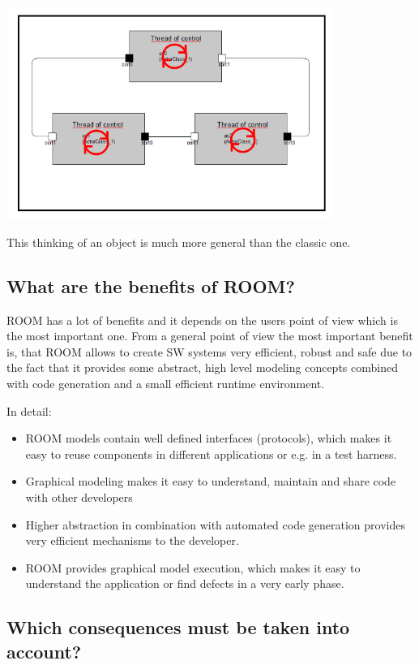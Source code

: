 \includegraphics[width=0.8\textwidth]{images/010-RoomIntroduction03.png}

This thinking of an object is much more general than the classic one.  

\subsection{What are the benefits of ROOM?}

ROOM has a lot of benefits and it depends on the users point of view which is the most important one. From a general
point of view the most important benefit is, that ROOM allows to create SW systems very efficient, robust and safe
due to the fact that it provides some abstract, high level modeling concepts combined with code generation and a
small efficient runtime environment.  

In detail:
\begin{itemize}
\item ROOM models contain well defined interfaces (protocols), which makes it easy to reuse components in different
applications or e.g. in a test harness. 
\item Graphical modeling makes it easy to understand, maintain and share code with other developers
\item Higher abstraction in combination with automated code generation provides very efficient mechanisms to
the developer. 
\item ROOM provides graphical model execution, which makes it easy to understand the application or find defects in
a very early phase. 
\end{itemize}

\subsection{Which consequences must be taken into account?}


